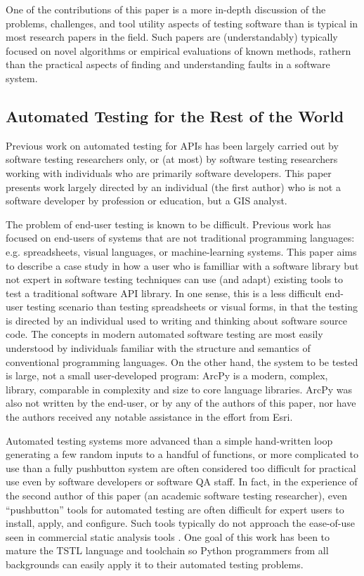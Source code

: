 One of the contributions of this paper is a more in-depth discussion
of the problems, challenges, and tool utility aspects of testing
software than is typical in most research papers in the field.  Such
papers are (understandably) typically focused on novel algorithms or
empirical evaluations of known methods, rathern than the practical aspects of finding
and understanding faults in a software system.


\subsection{Automated Testing for the Rest of the World}

Previous work on automated testing for APIs has been largely carried
out by software testing researchers only, or (at most) by software
testing researchers working with individuals who are primarily
software developers.  This paper presents work largely directed by an
individual (the first author) who is not a software developer by
profession or education, but a GIS analyst.  

The problem of end-user testing
\cite{burnettEUSE,Silos,rothermelTOSEM} is known to be difficult.
Previous work has focused on end-users of systems that are not
traditional programming languages: e.g. spreadsheets, visual
languages, or machine-learning systems.  This paper aims to describe a
case study in how a user who is familliar with a software library but
not expert in software testing techniques can use (and adapt) existing
tools to test a traditional software API library.  In one sense, this
is a less difficult end-user testing scenario than testing
spreadsheets or visual forms, in that the testing is directed by an
individual used to writing and thinking about software source code.
The concepts in modern automated software testing are most easily
understood by individuals familiar with the structure and semantics of
conventional programming languages.  On the other hand, the system to
be tested is large, not a small user-developed program: ArcPy is
a modern, complex, library, comparable in complexity and size to
core language libraries.   ArcPy was also not written by the end-user,
or by any of the authors of this paper, nor have the authors received
any notable assistance in the effort from Esri.

Automated testing systems more advanced than a simple hand-written loop generating 
a few random inputs to a handful of functions, or more complicated to 
use than a fully pushbutton system are often considered too difficult 
for practical use even by software developers or software QA staff.
In fact, in the experience of the second author of this paper (an
academic software testing researcher), even ``pushbutton'' tools for
automated testing are often difficult for expert users to install, apply, and
configure.  Such tools typically do not approach the ease-of-use seen
in commercial static analysis tools \cite{Coverity,Klocwork,CodeSonar}.  One goal of this work
has been to mature the TSTL language and toolchain so Python
programmers from all backgrounds can easily apply it to their
automated testing problems.

